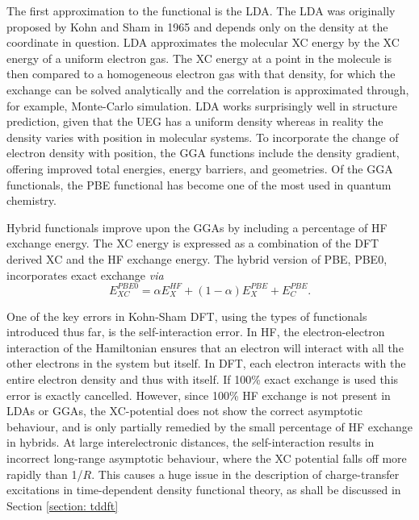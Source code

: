 The first approximation to the functional is the \ac{LDA}. The LDA was originally proposed by Kohn and Sham in 1965 and depends only on the density at the coordinate in question. LDA approximates the molecular \ac{XC} energy by the \ac{XC} energy of a uniform electron gas. The \ac{XC} energy at a point in the molecule is then compared to a homogeneous electron gas with that density, for which the exchange can be solved analytically and the correlation is approximated through, for example, Monte-Carlo simulation.\cite{Ullrich2012} LDA works surprisingly well in structure prediction, given that the UEG has a uniform density whereas in reality the density varies with position in molecular systems. To incorporate the change of electron density with position, the \ac{GGA} functions include the density gradient, offering improved total energies, energy barriers, and geometries. Of the \ac{GGA} functionals, the PBE functional has become one of the most used in quantum chemistry.\cite{Perdew1996}

Hybrid functionals improve upon the \ac{GGA}s by including a percentage of \ac{HF} exchange energy. The \ac{XC} energy is expressed as a combination of the \ac{DFT} derived \ac{XC} and the \ac{HF} exchange energy. The hybrid version of PBE, PBE0, incorporates exact exchange \textit{via}
\begin{equation}
    E_{XC}^{PBE0}=\alpha{}E_{X}^{HF}+(1-\alpha{})E_{X}^{PBE}+E_{C}^{PBE}.
\end{equation}

One of the key errors in Kohn-Sham \ac{DFT}, using the types of functionals introduced thus far, is the self-interaction error. In \ac{HF}, the electron-electron interaction of the Hamiltonian ensures that an electron will interact with all the other electrons in the system but itself. In \ac{DFT}, each electron interacts with the entire electron density and thus with itself. If 100\% exact exchange is used this error is exactly cancelled. However, since 100\% HF exchange is not present in \ac{LDA}s or \ac{GGA}s, the \ac{XC}-potential does not show the correct asymptotic behaviour, and is only partially remedied by the small percentage of \ac{HF} exchange in hybrids. At large interelectronic distances, the self-interaction results in incorrect long-range asymptotic behaviour, where the \ac{XC} potential falls off more rapidly than 1/$R$. This causes a huge issue in the description of charge-transfer excitations in time-dependent density functional theory, as shall be discussed in Section \ref{section: tddft}

